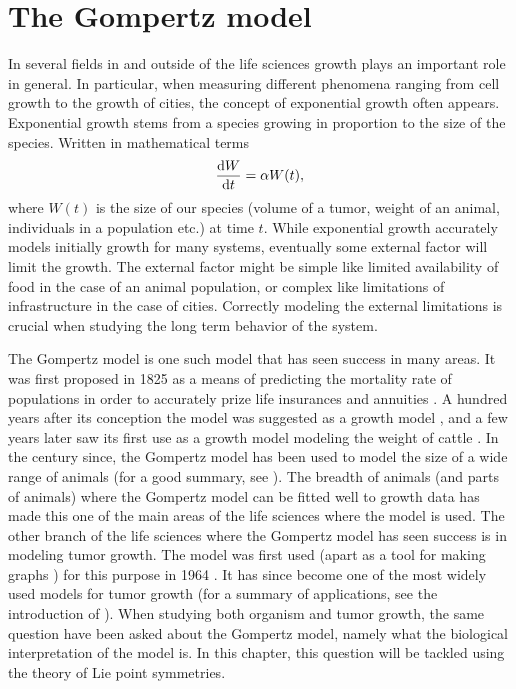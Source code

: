 \chapter{The Gompertz model}

In several fields in and outside of the life sciences growth plays an important role in general.
In particular, when measuring different phenomena ranging from cell growth to the growth of cities, the concept of exponential growth often appears.
Exponential growth stems from a species growing in proportion to the size of the species.
Written in mathematical terms
\begin{equation}
  \dv{W}{t} = \alpha W(t),
\end{equation}
where \(W(t)\) is the size of our species (volume of a tumor, weight of an animal, individuals in a population etc.) at time \(t\).
While exponential growth accurately models initially growth for many systems, eventually some external factor will limit the growth.
The external factor might be simple like limited availability of food in the case of an animal population, or complex like limitations of infrastructure in the case of cities. %
Correctly modeling the external limitations is crucial when studying the long term behavior of the system.

The Gompertz model is one such model that has seen success in many areas. %
It was first proposed in 1825 as a means of predicting the mortality rate of populations in order to accurately prize life insurances and annuities \cite{gompertz1825nature}. %
A hundred years after its conception the model was suggested as a growth model \cite{wright1926reviews}, and a few years later saw its first use as a growth model modeling the weight of cattle \cite{davidson1928growth}.
In the century since, the Gompertz model has been used to model the size of a wide range of animals (for a good summary, see \cite{tjorve2017gompertz}).
The breadth of animals (and parts of animals) where the Gompertz model can be fitted well to growth data has made this one of the main areas of the life sciences where the model is used.
The other branch of the life sciences where the Gompertz model has seen success is in modeling tumor growth.
The model was first used (apart as a tool for making graphs \cite{casey1934alteration}) for this purpose in 1964 \cite{laird1964dynamics}.
It has since become one of the most widely used models for tumor growth \cite{gerlee2013muddle} (for a summary of applications, see the introduction of \cite{benzekry2014classical}).
When studying both organism and tumor growth, the same question have been asked about the Gompertz model, namely what the biological interpretation of the model is.
In this chapter, this question will be tackled using the theory of Lie point symmetries.

